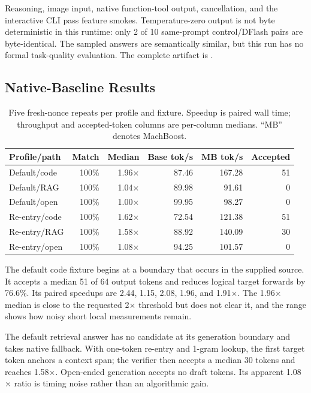 \documentclass[11pt]{article}
\begin{document}
Reasoning, image input, native function-tool output, cancellation, and the
interactive CLI pass feature smokes. Temperature-zero output is not byte
deterministic in this runtime: only 2 of 10 same-prompt control/DFlash pairs are
byte-identical. The sampled answers are semantically similar, but this run has
no formal task-quality evaluation. The complete artifact is
.

\subsection{Native-Baseline Results}
\begin{table}[H]
\centering
\small
\begin{tabular}{lrrrrr}
\toprule
Profile/path & Match & Median & Base tok/s & MB tok/s & Accepted \\
\midrule
Default/code & 100\% & 1.96$\times$ & 87.46 & 167.28 & 51 \\
Default/RAG & 100\% & 1.04$\times$ & 89.98 & 91.61 & 0 \\
Default/open & 100\% & 1.00$\times$ & 99.95 & 98.27 & 0 \\
Re-entry/code & 100\% & 1.62$\times$ & 72.54 & 121.38 & 51 \\
Re-entry/RAG & 100\% & 1.58$\times$ & 88.92 & 140.09 & 30 \\
Re-entry/open & 100\% & 1.08$\times$ & 94.25 & 101.57 & 0 \\
\bottomrule
\end{tabular}
\caption{Five fresh-nonce repeats per profile and fixture. Speedup is paired wall time; throughput and accepted-token columns are per-column medians. ``MB'' denotes MachBoost.}
\label{tab:native}
\end{table}

The default code fixture begins at a boundary that occurs in the supplied source. It accepts a median 51 of 64 output tokens and reduces logical target forwards by 76.6\%. Its paired speedups are 2.44, 1.15, 2.08, 1.96, and 1.91$\times$. The 1.96$\times$ median is close to the requested 2$\times$ threshold but does not clear it, and the range shows how noisy short local measurements remain.

The default retrieval answer has no candidate at its generation boundary and takes native fallback. With one-token re-entry and 1-gram lookup, the first target token anchors a context span; the verifier then accepts a median 30 tokens and reaches 1.58$\times$. Open-ended generation accepts no draft tokens. Its apparent 1.08$\times$ ratio is timing noise rather than an algorithmic gain.
\end{document}
